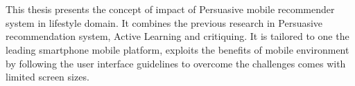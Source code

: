 \chapter{\abstractname}



This thesis presents the concept of impact of Persuasive mobile recommender system in lifestyle domain. It combines the previous research in Persuasive recommendation system, Active Learning and critiquing. It is tailored to one the leading smartphone mobile platform, exploits the benefits of mobile environment by following the user interface guidelines to overcome the challenges comes with limited screen sizes.\newline
